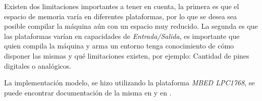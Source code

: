   Existen dos limitaciones importantes a tener en cuenta, la primera es que
el espacio de memoria varía en diferentes plataformas, por lo que se desea
sea posible compilar la máquina aún con un espacio muy reducido.
  La segunda es que las plataformas varían en capacidades
de \textit{Entrada/Salida}, es importante que quien compila la máquina y
arma un entorno tenga conocimiento de cómo disponer las mismas y qué
limitaciones existen, por ejemplo: Cantidad de pines digitales o analógicos.

  La implementación modelo, se hizo utilizando
  la plataforma \textit{MBED LPC1768},
se puede encontrar documentación de la misma en \cite{mbed-LPC1768} 
y en \cite{mbed}.

